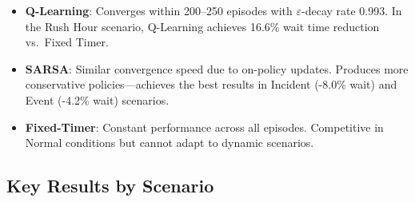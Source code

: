 \documentclass[12pt, a4paper]{article}
\begin{document}
\begin{itemize}[nosep]
    \item \textbf{Q-Learning}: Converges within 200--250 episodes with $\varepsilon$-decay rate 0.993. In the Rush Hour scenario, Q-Learning achieves 16.6\% wait time reduction vs.\ Fixed Timer.
    \item \textbf{SARSA}: Similar convergence speed due to on-policy updates. Produces more conservative policies---achieves the best results in Incident (-8.0\% wait) and Event (-4.2\% wait) scenarios.
    \item \textbf{Fixed-Timer}: Constant performance across all episodes. Competitive in Normal conditions but cannot adapt to dynamic scenarios.
\end{itemize}

\subsection{Key Results by Scenario}
\end{document}
